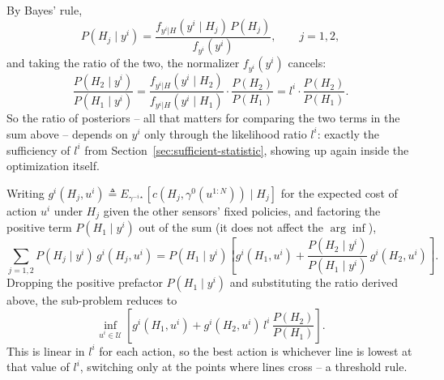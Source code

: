 \documentclass[11pt]{article}
\begin{document}
By Bayes' rule,
\begin{equation}
    P(H_j \mid y^i) = \frac{f_{y^i|H}(y^i \mid H_j)\,P(H_j)}{f_{y^i}(y^i)}, \qquad j=1,2,
\end{equation}
and taking the ratio of the two, the normalizer $f_{y^i}(y^i)$ cancels:
\begin{equation}
    \frac{P(H_2 \mid y^i)}{P(H_1\mid y^i)} = \frac{f_{y^i|H}(y^i\mid H_2)}{f_{y^i|H}(y^i\mid H_1)}\cdot\frac{P(H_2)}{P(H_1)} = l^i \cdot \frac{P(H_2)}{P(H_1)}.
\end{equation}
So the ratio of posteriors -- all that matters for comparing the two terms in the sum above -- depends on $y^i$ only through the likelihood ratio $l^i$: exactly the sufficiency of $l^i$ from Section~\ref{sec:sufficient-statistic}, showing up again inside the optimization itself.

Writing $g^i(H_j,u^i) \triangleq E_{\gamma^{-i\star}}[c(H_j,\gamma^0(u^{1:N}))\mid H_j]$ for the expected cost of action $u^i$ under $H_j$ given the other sensors' fixed policies, and factoring the positive term $P(H_1\mid y^i)$ out of the sum (it does not affect the $\arg\inf$),
\begin{equation}
    \sum_{j=1,2} P(H_j\mid y^i)\,g^i(H_j,u^i) = P(H_1\mid y^i)\left[g^i(H_1,u^i) + \frac{P(H_2\mid y^i)}{P(H_1\mid y^i)}\,g^i(H_2,u^i)\right].
\end{equation}
Dropping the positive prefactor $P(H_1\mid y^i)$ and substituting the ratio derived above, the sub-problem reduces to
\begin{equation}
    \inf_{u^i \in \mathcal U} \left[ g^i(H_1, u^i) + g^i(H_2, u^i)\, l^i\,
    \frac{P(H_2)}{P(H_1)} \right].
\end{equation}
This is linear in $l^i$ for each action, so the best action is whichever line is lowest at that value of $l^i$, switching only at the points where lines cross -- a threshold rule.
\end{document}
